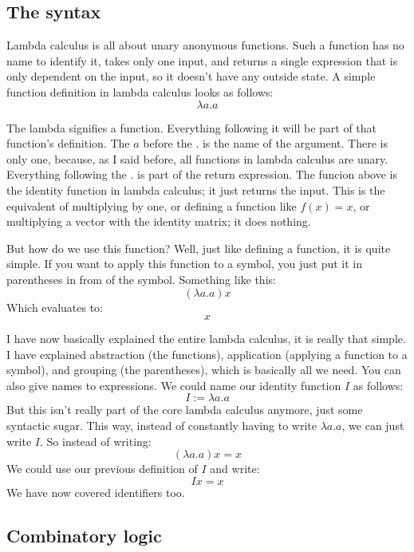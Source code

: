 \documentclass[a4paper, 11pt]{article}
\begin{document}

\subsection{The syntax}

Lambda calculus is all about unary anonymous functions. Such a function has no
name to identify it, takes only one input, and returns a single expression that
is only dependent on the input, so it doesn't have any outside state. A simple
function definition in lambda calculus looks as follows:
\[\lambda a.a\]

The lambda signifies a function. Everything following it will be part of that
function's definition. The \(a\) before the \(.\) is the name of the argument.
There is only one, because, as I said before, all functions in lambda calculus
are unary. Everything following the \(.\) is part of the return expression. The
funcion above is the identity function in lambda calculus; it just returns the
input. This is the equivalent of multiplying by one, or defining a function
like \(f(x)=x\), or multiplying a vector with the identity matrix; it does
nothing.

But how do we use this function? Well, just like defining a function, it is
quite simple. If you want to apply this function to a symbol, you just put it
in parentheses in from of the symbol. Something like this:
\[(\lambda a.a)x\]
Which evaluates to:
\[x\]

I have now basically explained the entire lambda calculus, it is really that
simple. I have explained abstraction (the functions), application (applying a
function to a symbol), and grouping (the parentheses), which is basically all
we need. You can also give names to expressions. We could name our identity
function \(I\) as follows: \[I:=\lambda a.a\] But this isn't really part of the
core lambda calculus anymore, just some syntactic sugar. This way, instead of
constantly having to write \(\lambda a.a\), we can just write \(I\). So instead
of writing:
\[(\lambda a.a)x=x\]
We could use our previous definition of \(I\) and write:
\[Ix=x\]
We have now covered identifiers too.

\subsection{Combinatory logic}

\end{document}
